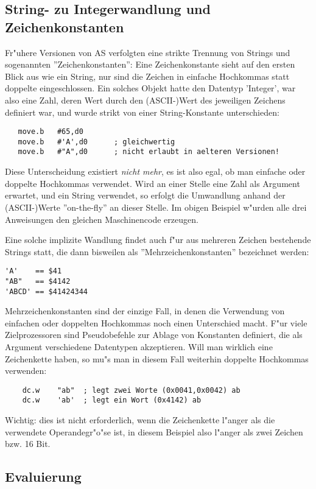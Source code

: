 \documentclass[12pt,a4paper,twoside]{report}
\begin{document}
\subsection{String- zu Integerwandlung und Zeichenkonstanten}

Fr"uhere Versionen von AS verfolgten eine strikte Trennung von Strings
und sogenannten ''Zeichenkonstanten'': Eine Zeichenkonstante sieht
auf den ersten Blick aus wie ein String, nur sind die Zeichen in 
einfache Hochkommas statt doppelte eingeschlossen.  Ein solches
Objekt hatte den Datentyp 'Integer', war also eine Zahl, deren Wert
durch den (ASCII-)Wert des jeweiligen Zeichens definiert war, und wurde
strikt von einer String-Konstante unterschieden:

\begin{verbatim}
   move.b   #65,d0
   move.b   #'A',d0      ; gleichwertig
   move.b   #"A",d0      ; nicht erlaubt in aelteren Versionen!
\end{verbatim}

Diese Unterscheidung existiert {\em nicht mehr}, es ist also egal, ob
man einfache oder doppelte Hochkommas verwendet.  Wird an einer Stelle eine
Zahl als Argument erwartet, und ein String verwendet, so erfolgt die
Umwandlung anhand der (ASCII-)Werte ''on-the-fly'' an dieser Stelle.  Im
obigen Beispiel w"urden alle drei Anweisungen den gleichen Maschinencode
erzeugen.

Eine solche implizite Wandlung findet auch f"ur aus mehreren Zeichen
bestehende Strings statt, die dann bisweilen als ''Mehrzeichenkonstanten''
bezeichnet werden:
\begin{verbatim}
'A'    == $41
"AB"   == $4142
'ABCD' == $41424344
\end{verbatim}
Mehrzeichenkonstanten sind der einzige Fall, in denen die Verwendung von
einfachen oder doppelten Hochkommas noch einen Unterschied macht.  F"ur
viele Zielprozessoren sind Pseudobefehle zur Ablage von Konstanten definiert,
die als Argument verschiedene Datentypen akzeptieren.  Will man wirklich
eine Zeichenkette haben, so mu"s man in diesem Fall weiterhin doppelte
Hochkommas verwenden:
\begin{verbatim}
    dc.w    "ab"  ; legt zwei Worte (0x0041,0x0042) ab
    dc.w    'ab'  ; legt ein Wort (0x4142) ab
\end{verbatim}
Wichtig: dies ist nicht erforderlich, wenn die Zeichenkette l"anger als die
verwendete Operandegr"o"se ist, in diesem Beispiel also l"anger als zwei
Zeichen bzw. 16 Bit.

\subsection{Evaluierung}
\end{document}
